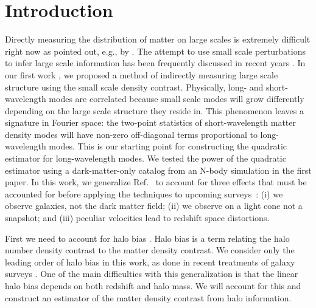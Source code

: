 \documentclass[prd,amsmath,amssymb,floatfix,superscriptaddress,nofootinbib,twocolumn]{revtex4-1}
\begin{document}
\section{Introduction} \label{sec1}
\noindent Directly measuring the distribution of matter on large scales is extremely difficult right now as pointed out, e.g., by \cite{Modi:2019hydr}. The attempt to use small scale perturbations to infer large scale information has been frequently discussed in recent years \cite{Baldauf:2011fer}\cite{Jeong:2012foss}\cite{Li:2014ssc}\cite{Zhu:2016tidal}\cite{Barreira:2017res}. In our first work \cite{Li:2020fir}, we proposed a method of indirectly measuring large scale structure using the small scale density contrast. Physically, long- and short-wavelength modes are correlated because small scale modes will grow differently depending on the large scale structure they reside in. This phenomenon leaves a signature in Fourier space: the two-point statistics of short-wavelength matter density modes will have non-zero off-diagonal terms proportional to long-wavelength modes. This is our starting point for constructing the quadratic estimator for long-wavelength modes. We tested the power of the quadratic estimator using a dark-matter-only catalog from an N-body simulation in the first paper. In this work, we generalize Ref.~\cite{Li:2020fir} to account for three effects that must be accounted for before applying the techniques to upcoming surveys~\cite{LSST:2012ls}\cite{Wfirst:2012jg}\cite{DESI:2019ds}: (i) we observe galaxies, not the dark matter field; (ii) we observe on a light cone not a snapshot; and (iii) peculiar velocities lead to redshift space distortions.

First we need to account for halo bias \cite{Kravtsov:1999hb}\cite{Desjacques:2018rev}. Halo bias is a term relating the halo number density contrast to the matter density contrast. We consider only the leading order of halo bias in this work, as done in recent treatments of galaxy surveys \cite{Seljak:2004sj}\cite{Chang:2016npo}\cite{Prat:2016xor}. One of the main difficulties with this generalization is that the linear halo bias depends on both redshift and halo mass. We will account for this and construct an estimator of the matter density contrast from halo information.
\end{document}

